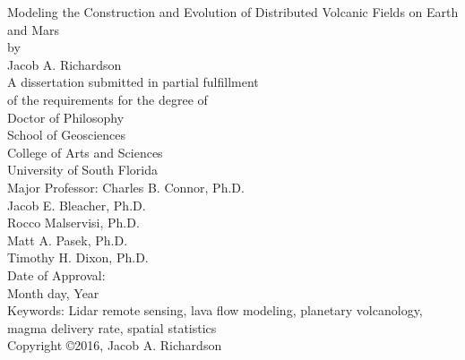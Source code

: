 \begin{titlepage}
\begin{center}
\singlespacing
{ \vspace*{\baselineskip} }
{ \vspace*{\baselineskip} }
{ \vspace*{\baselineskip} }
{ \vspace*{\baselineskip} }
Modeling the Construction and Evolution of Distributed Volcanic Fields on Earth and Mars\\
{ \vspace*{\baselineskip} }
{ \vspace*{\baselineskip} }
{ \vspace*{\baselineskip} }
by\\
{ \vspace*{\baselineskip} }
{ \vspace*{\baselineskip} }
{ \vspace*{\baselineskip} }
Jacob A. Richardson\\
{ \vspace*{\baselineskip} }
{ \vspace*{\baselineskip} }
{ \vspace*{\baselineskip} }
{ \vspace*{\baselineskip} }
A dissertation submitted in partial fulfillment\\
of the requirements for the degree of\\
Doctor of Philosophy\\
School of Geosciences\\
College of Arts and Sciences\\
University of South Florida\\
{ \vspace*{\baselineskip} }
{ \vspace*{\baselineskip} }
{ \vspace*{\baselineskip} }
Major Professor: Charles B. Connor, Ph.D.\\
Jacob E. Bleacher, Ph.D.\\
Rocco Malservisi, Ph.D.\\
Matt A. Pasek, Ph.D.\\
Timothy H. Dixon, Ph.D.\\
{ \vspace*{\baselineskip} }
{ \vspace*{\baselineskip} }
Date of Approval:\\
Month day, Year\\
{ \vspace*{\baselineskip} }
{ \vspace*{\baselineskip} }
{ \vspace*{\baselineskip} }
Keywords: Lidar remote sensing, lava flow modeling, planetary volcanology, magma delivery rate, spatial statistics\\
{ \vspace*{\baselineskip} }
Copyright \copyright\hspace{1mm}2016, Jacob A. Richardson\\
\end{center}
\end{titlepage}

